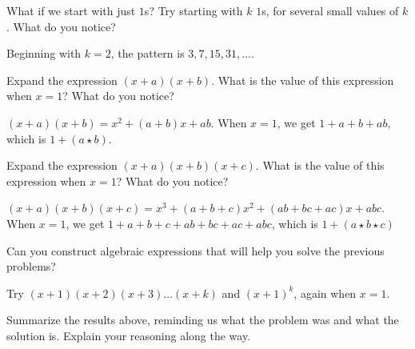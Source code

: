 \documentclass{ximera}
\begin{document}
\begin{problem}
What if we start with just $1$s?  Try starting with $k$ $1$s, for several small values of $k$.  What do you notice?  
\begin{freeResponse}
Beginning with $k=2$, the pattern is $3, 7, 15, 31, \dots$.  
\end{freeResponse}
\vfill
\end{problem}

\newpage 

\begin{problem}
Expand the expression $(x+a)(x+b)$.  What is the value of this expression when $x=1$?  What do you notice?
\begin{freeResponse}
$(x+a)(x+b) = x^2+ (a+b)x+ab$.  When $x=1$, we get $1+a+b+ab$, which is $1+(a\star b)$.  
\end{freeResponse}
\vfill
\end{problem}

\begin{problem}
Expand the expression $(x+a)(x+b)(x+c)$.  What is the value of this expression when $x=1$?  What do you notice?
\begin{freeResponse}
$(x+a)(x+b)(x+c) = x^3+ (a+b+c)x^2+(ab+bc+ac)x+abc$.  When $x=1$, we get $1+a+b+c+ab+bc+ac+abc$, 
which is $1+(a\star b\star c)$
\end{freeResponse}
\vfill
\end{problem}

\newpage 

\begin{problem}
Can you construct algebraic expressions that will help you solve the previous problems?  
\begin{freeResponse}
Try $(x+1)(x+2)(x+3)\dots(x+k)$ and $(x+1)^k$, again when $x=1$.  
\end{freeResponse}
\vfill
\end{problem}

\begin{problem}
Summarize the results above, reminding us what the problem was and
what the solution is. Explain your reasoning along the way.
\begin{freeResponse}
\end{freeResponse}
\vfill
\end{problem}
\end{document}
